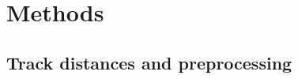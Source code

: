 \documentclass[preprint,authoryear,a4paper,10pt,onecolumn]{elsarticle}
\begin{document}
\section{Methods}











\subsection{\label{sub:track-distances}Track distances and preprocessing}
\end{document}
